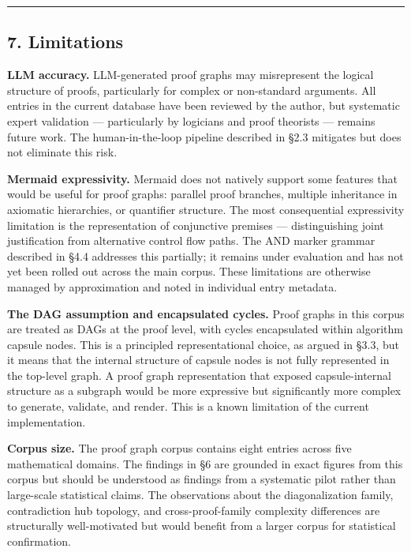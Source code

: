 \documentclass[
  11pt]{article}
\begin{document}
\begin{center}\rule{0.5\linewidth}{0.5pt}\end{center}

\hypertarget{7-limitations}{%
\subsection{7. Limitations}\label{7-limitations}}

\textbf{LLM accuracy.} LLM-generated proof graphs may misrepresent the
logical structure of proofs, particularly for complex or non-standard
arguments. All entries in the current database have been reviewed by the
author, but systematic expert validation --- particularly by logicians
and proof theorists --- remains future work. The human-in-the-loop
pipeline described in §2.3 mitigates but does not eliminate this risk.

\textbf{Mermaid expressivity.} Mermaid does not natively support some
features that would be useful for proof graphs: parallel proof branches,
multiple inheritance in axiomatic hierarchies, or quantifier structure.
The most consequential expressivity limitation is the representation of
conjunctive premises --- distinguishing joint justification from
alternative control flow paths. The AND marker grammar described in §4.4
addresses this partially; it remains under evaluation and has not yet
been rolled out across the main corpus. These limitations are otherwise
managed by approximation and noted in individual entry metadata.

\textbf{The DAG assumption and encapsulated cycles.} Proof graphs in
this corpus are treated as DAGs at the proof level, with cycles
encapsulated within algorithm capsule nodes. This is a principled
representational choice, as argued in §3.3, but it means that the
internal structure of capsule nodes is not fully represented in the
top-level graph. A proof graph representation that exposed
capsule-internal structure as a subgraph would be more expressive but
significantly more complex to generate, validate, and render. This is a
known limitation of the current implementation.

\textbf{Corpus size.} The proof graph corpus contains eight entries
across five mathematical domains. The findings in §6 are grounded in
exact figures from this corpus but should be understood as findings from
a systematic pilot rather than large-scale statistical claims. The
observations about the diagonalization family, contradiction hub
topology, and cross-proof-family complexity differences are structurally
well-motivated but would benefit from a larger corpus for statistical
confirmation.
\end{document}
